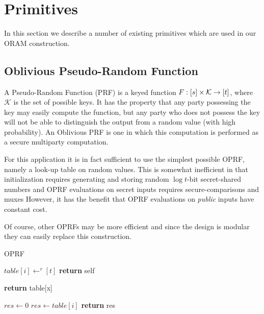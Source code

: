 
\section{Primitives}

In this section we describe a number of existing primitives which are
used in our ORAM construction.

\subsection{Oblivious Pseudo-Random Function}

A Pseudo-Random Function (PRF) is a keyed function
$F: [s] \times \mathcal{K} \rightarrow [t]$, 
where $\mathcal{K}$ is the set of possible keys.
It has the property that
any party possessing the key may easily compute the function,
but any party who does not possess the key
will not be able to distinguish the output from a random value
(with high probability).
An Oblivious PRF is one in which this computation is performed
as a secure multiparty computation.

For this application it is in fact sufficient to use the simplest possible
OPRF, namely a look-up table on random values.
This is somewhat inefficient in that 
initialization requires generating and storing 
\prfSize random $\log{t}$-bit secret-shared numbers
and OPRF evaluations on secret inputs requires 
\prfSize secure-comparisons and \prfSize muxes 
However, it has the benefit that OPRF evaluations on 
\emph{public} inputs have constant cost.

Of course, other OPRFs may be more efficient and since the design
is modular they can easily replace this construction.

\begin{algorithm}
\caption{OPRF}
\label{alg:oprf}
\begin{algorithmic}[1]

    \State $table[i] \gets^r [t]$
\EndFor
\State \textbf{return} self
\EndProcedure

\State

 
\State \textbf{return} table[x]
\EndProcedure

\State

\State $res \gets 0$
    \State $res \gets table[i]$
    \EndOblivIf
\EndFor
\State \textbf{return} res
\EndProcedure

\end{algorithmic}
\end{algorithm}


